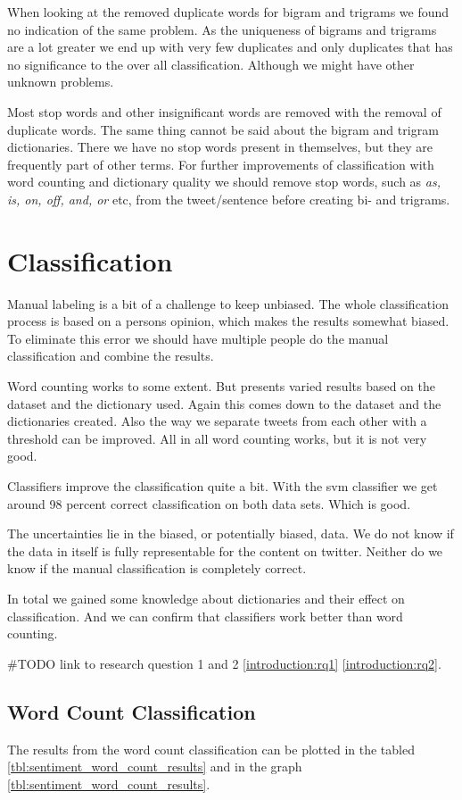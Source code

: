 When looking at the removed duplicate words for bigram and trigrams we found no
indication of the same problem. As the uniqueness of bigrams and trigrams are a
lot greater we end up with very few duplicates and only duplicates that has no
significance to the over all classification. Although we might have other
unknown problems.

Most stop words and other insignificant words are removed with the removal of
duplicate words. The same thing cannot be said about the bigram and trigram
dictionaries. There we have no stop words present in themselves, but they are
frequently part of other terms. For further improvements of classification with
word counting and dictionary quality we should remove
stop words, such as \textit{as, is, on, off, and, or} etc, from the
tweet/sentence before creating bi- and trigrams.
%


\section{Classification}
Manual labeling is a bit of a challenge to keep unbiased. The whole
classification process is based on a persons opinion, which makes the results
somewhat biased. To eliminate this error we should have multiple people do the
manual classification and combine the results.  

Word counting works to some extent. But presents varied results based on the
dataset and the dictionary used. Again this comes down to the dataset and the
dictionaries created. Also the way we separate tweets from each other with a
threshold can be improved. All in all word counting works, but it is not very
good. 

Classifiers  improve the classification quite a bit. With the svm classifier we
get around 98 percent correct classification on both data sets. Which is good.

The uncertainties lie in the biased, or potentially biased, data. We do not
know if the data in itself is fully representable for the content on twitter.
Neither do we know if the manual classification is completely correct. 

In total we gained some knowledge about dictionaries and their effect on
classification. And we can confirm that classifiers work better than word
counting.  

#TODO link to research question 1 and 2 \ref{introduction:rq1}
\ref{introduction:rq2}.

\subsection{Word Count Classification}\label{results:word_count_classification}
The results from the word count classification can be plotted in the tabled
\ref{tbl:sentiment_word_count_results} and in the graph
\ref{tbl:sentiment_word_count_results}.

